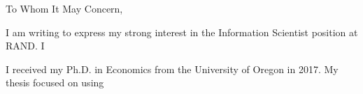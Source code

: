 \documentclass[11pt]{article}
\begin{document}
\noindent To Whom It May Concern,

\noindent I am writing to express my strong interest in the Information Scientist position at RAND. I 

I received my Ph.D. in Economics from the University of Oregon in 2017. My thesis focused on using 
\end{document}
